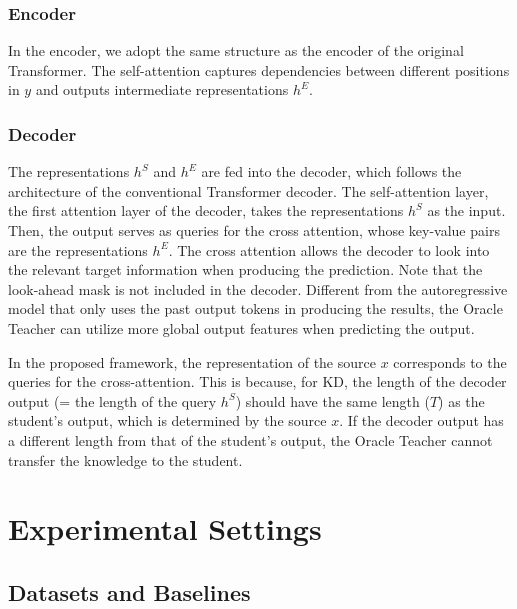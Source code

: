 \documentclass[journal]{IEEEtran}
\begin{document}
\subsubsection{Encoder}
In the encoder, we adopt the same structure as the encoder of the original Transformer. 
The self-attention captures dependencies between different positions in $y$ and outputs intermediate representations $h^{E}$.
\subsubsection{Decoder}
The representations $h^{S}$ and $h^{E}$ are fed into the decoder, which follows the architecture of the conventional Transformer decoder.
The self-attention layer, the first attention layer of the decoder, takes the representations $h^{S}$ as the input.
Then, the output serves as queries for the cross attention, whose key-value pairs are the representations $h^{E}$.
The cross attention allows the decoder to look into the relevant target information when producing the prediction.
Note that the look-ahead mask is not included in the decoder.
Different from the autoregressive model that only uses the past output tokens in producing the results, the Oracle Teacher can utilize more global output features when predicting the output.

In the proposed framework, the representation of the source $x$ corresponds to the queries for the cross-attention.
This is because, for KD, the length of the decoder output (= the length of the query $h^S$) should have the same length ($T$) as the student's output, which is determined by the source $x$.
If the decoder output has a different length from that of the student's output, the Oracle Teacher cannot transfer the knowledge to the student.



\section{Experimental Settings}
\subsection{Datasets and Baselines}
\end{document}
